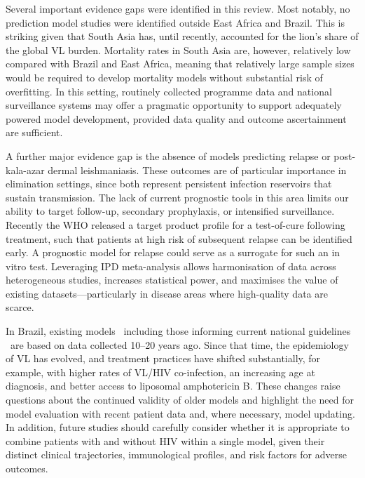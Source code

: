 Several important evidence gaps were identified in this review. Most notably, no prediction model studies were identified outside East Africa and Brazil. This is striking given that South Asia has, until recently, accounted for the lion's share of the global VL burden. Mortality rates in South Asia are, however, relatively low compared with Brazil and East Africa, meaning that relatively large sample sizes would be required to develop mortality models without substantial risk of overfitting. In this setting, routinely collected programme data and national surveillance systems may offer a pragmatic opportunity to support adequately powered model development, provided data quality and outcome ascertainment are sufficient.

A further major evidence gap is the absence of models predicting relapse or post-kala-azar dermal leishmaniasis. These outcomes are of particular importance in elimination settings, since both represent persistent infection reservoirs that sustain transmission\cite{who_sea_elim, WHO_nairobi_declaration}. The lack of current prognostic tools in this area limits our ability to target follow-up, secondary prophylaxis, or intensified surveillance. Recently the WHO released a target product profile for a test-of-cure following treatment, such that patients at high risk of subsequent relapse can be identified early\cite{WHO2024_Leishmaniasis}. A prognostic model for relapse could serve as a surrogate for such an in vitro test. Leveraging IPD meta-analysis allows harmonisation of data across heterogeneous studies, increases statistical power, and maximises the value of existing datasets—particularly in disease areas where high-quality data are scarce.

In Brazil, existing models \textemdash\ including those informing current national guidelines\cite{Brasil_2024_GuiaVigilanciaSaude} \textemdash\ are based on data collected 10--20 years ago. Since that time, the epidemiology of VL has evolved, and treatment practices have shifted substantially, for example, with higher rates of VL/HIV co-infection, an increasing age at diagnosis, and better access to liposomal amphotericin B\cite{lima2018}. These changes raise questions about the continued validity of older models and highlight the need for model evaluation with recent patient data and, where necessary, model updating. In addition, future studies should carefully consider whether it is appropriate to combine patients with and without HIV within a single model, given their distinct clinical trajectories, immunological profiles, and risk factors for adverse outcomes\cite{cota2011}.

